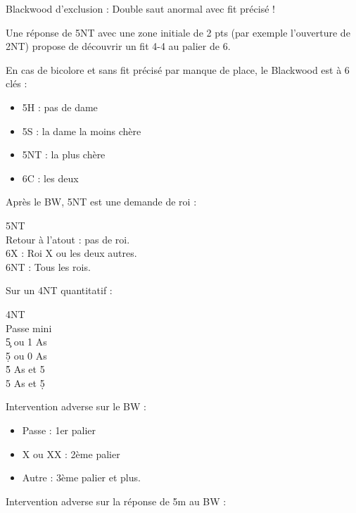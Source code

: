 \documentclass[a4paper]{article}
\begin{document}
Blackwood d'exclusion : Double saut anormal avec fit précisé !

Une réponse de 5NT avec une zone initiale de 2 pts (par exemple l'ouverture de 2NT) propose de découvrir un fit 4-4 au palier de 6.

En cas de bicolore et sans fit précisé par manque de place, le Blackwood est à 6 clés :

\begin{itemize}
\item 5H : pas de dame

\item 5S : la dame la moins chère

\item 5NT : la plus chère

\item 6C : les deux

\end{itemize}

Après le BW, 5NT est une demande de roi :

\begin{bidtable}
5NT\+\\
Retour \> à l'atout : pas de roi.\\
6X \> : Roi X ou les deux autres.\\
6NT \> : Tous les rois.\-
\end{bidtable}

Sur un 4NT quantitatif :

\begin{bidtable}
4NT\+\\
Passe \> mini\\
5\c {} ou 1 As\\
5\d {} ou 0 As\\
5\h {} As et 5\c \\
5\s {} As et 5\d \-
\end{bidtable}

Intervention adverse sur le BW :

\begin{itemize}
\item Passe : 1er palier 

\item X ou XX : 2ème palier

\item Autre :  3ème palier et plus.

\end{itemize}

Intervention adverse sur la réponse de 5m au BW :
\end{document}
